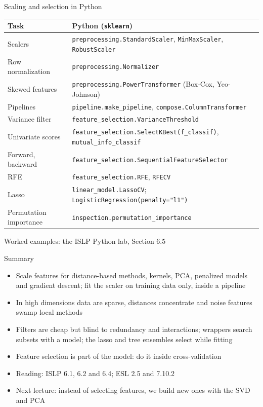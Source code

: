 \begin{frame}{Scaling and selection in Python}
    \centering
    \scriptsize
    \begin{tabular}{@{}l l@{}}
        \toprule
        Task & Python (\texttt{sklearn}) \\
        \midrule
        Scalers & \texttt{preprocessing.StandardScaler}, \texttt{MinMaxScaler}, \texttt{RobustScaler} \\
        Row normalization & \texttt{preprocessing.Normalizer} \\
        Skewed features & \texttt{preprocessing.PowerTransformer} (Box-Cox, Yeo-Johnson) \\
        Pipelines & \texttt{pipeline.make\_pipeline}, \texttt{compose.ColumnTransformer} \\
        Variance filter & \texttt{feature\_selection.VarianceThreshold} \\
        Univariate scores & \texttt{feature\_selection.SelectKBest(f\_classif)}, \texttt{mutual\_info\_classif} \\
        Forward, backward & \texttt{feature\_selection.SequentialFeatureSelector} \\
        RFE & \texttt{feature\_selection.RFE}, \texttt{RFECV} \\
        Lasso & \texttt{linear\_model.LassoCV}; \texttt{LogisticRegression(penalty="l1")} \\
        Permutation importance & \texttt{inspection.permutation\_importance} \\
        \bottomrule
    \end{tabular}

    \svspace{0.5em}
    Worked examples: the ISLP Python lab, Section 6.5
\end{frame}

\begin{frame}{Summary}
    \begin{itemize}
        \item Scale features for distance-based methods, kernels, PCA, penalized models and gradient descent; fit the scaler on training data only, inside a pipeline
        \item In high dimensions data are sparse, distances concentrate and noise features swamp local methods
        \item Filters are cheap but blind to redundancy and interactions; wrappers search subsets with a model; the lasso and tree ensembles select while fitting
        \item Feature selection is part of the model: do it inside cross-validation
        \item Reading: ISLP 6.1, 6.2 and 6.4; ESL 2.5 and 7.10.2
        \item Next lecture: instead of selecting features, we build new ones with the SVD and PCA
    \end{itemize}
\end{frame}